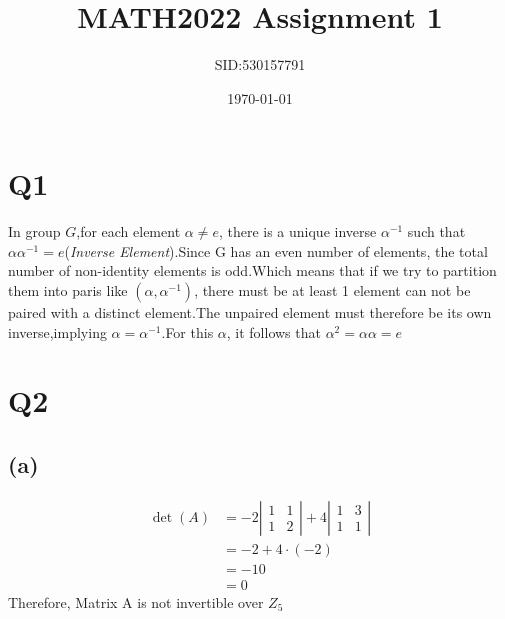 \documentclass[12pt]{article}
\title{MATH2022 Assignment 1}
\author{SID:530157791}
\date{\today}
\begin{document}
\maketitle

\section{Q1}
	In group $G$,for each element $\alpha \neq e$, there is a unique inverse $\alpha^{-1}$ such that $\alpha \alpha^{-1} = e$(\textit{Inverse Element}).Since G has an even number of elements, the total number of non-identity elements is odd.Which means that if we try to partition them into paris like $(\alpha,\alpha^{-1})$, there must be at least 1 element can not be paired with a distinct element.The unpaired element must therefore be its own inverse,implying $\alpha = \alpha^{-1}$.For this $\alpha$, it follows that $\alpha^2 = \alpha \alpha = e$

\section{Q2}
	\subsection*{(a)}
		$$
		\begin{aligned}
		\operatorname{det}(A) & =-2\left|\begin{array}{ll}
		1 & 1 \\
		1 & 2
		\end{array}\right|+4\left|\begin{array}{ll}
		1 & 3 \\
		1 & 1
		\end{array}\right| \\
		& =-2+4 \cdot(-2) \\
		& =-10 \\
		& =0 
		\end{aligned}
		$$
		Therefore, Matrix A is not invertible over $Z_5$
\end{document}
